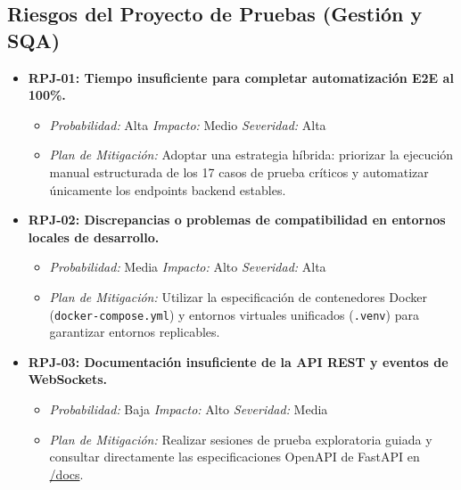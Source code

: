 \subsection{Riesgos del Proyecto de Pruebas (Gestión y SQA)}
\label{subsec:riesgos-proyecto}

\begin{itemize}
    \item \textbf{RPJ-01: Tiempo insuficiente para completar automatización E2E al 100\%.}
    \begin{itemize}
        \item \textit{Probabilidad:} Alta \quad \textit{Impacto:} Medio \quad \textit{Severidad:} Alta
        \item \textit{Plan de Mitigación:} Adoptar una estrategia híbrida: priorizar la ejecución manual estructurada de los 17 casos de prueba críticos y automatizar únicamente los endpoints backend estables.
    \end{itemize}
    \item \textbf{RPJ-02: Discrepancias o problemas de compatibilidad en entornos locales de desarrollo.}
    \begin{itemize}
        \item \textit{Probabilidad:} Media \quad \textit{Impacto:} Alto \quad \textit{Severidad:} Alta
        \item \textit{Plan de Mitigación:} Utilizar la especificación de contenedores Docker (\texttt{docker-compose.yml}) y entornos virtuales unificados (\texttt{.venv}) para garantizar entornos replicables.
    \end{itemize}
    \item \textbf{RPJ-03: Documentación insuficiente de la API REST y eventos de WebSockets.}
    \begin{itemize}
        \item \textit{Probabilidad:} Baja \quad \textit{Impacto:} Alto \quad \textit{Severidad:} Media
        \item \textit{Plan de Mitigación:} Realizar sesiones de prueba exploratoria guiada y consultar directamente las especificaciones OpenAPI de FastAPI en \url{/docs}.
    \end{itemize}
\end{itemize}

